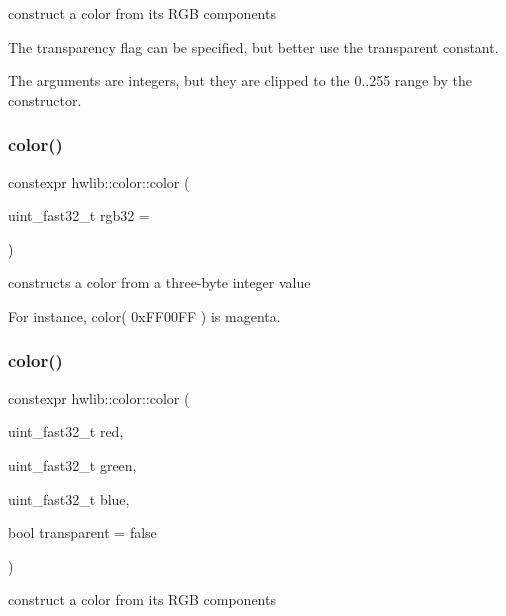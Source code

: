 construct a color from its R\+GB components 

The transparency flag can be specified, but better use the transparent constant.

The arguments are integers, but they are clipped to the 0..255 range by the constructor. \mbox{\label{classhwlib_1_1color_aa8d2263ebf5efe2221171217166a669f}} 
\subsubsection{\texorpdfstring{color()}{color()}\hspace{0.1cm}{\footnotesize\ttfamily [2/4]}}
{\footnotesize\ttfamily constexpr hwlib\+::color\+::color (\begin{DoxyParamCaption}\item[{uint\+\_\+fast32\+\_\+t}]{rgb32 = {} }\end{DoxyParamCaption})\hspace{0.3cm}{\ttfamily [inline]}}



constructs a color from a three-\/byte integer value 

For instance, color( 0x\+F\+F00\+F\+F ) is magenta. \mbox{\label{classhwlib_1_1color_a35fd6b9a03fa8f5b78bbf55052760bd3}} 
\subsubsection{\texorpdfstring{color()}{color()}\hspace{0.1cm}{\footnotesize\ttfamily [3/4]}}
{\footnotesize\ttfamily constexpr hwlib\+::color\+::color (\begin{DoxyParamCaption}\item[{uint\+\_\+fast32\+\_\+t}]{red,  }\item[{uint\+\_\+fast32\+\_\+t}]{green,  }\item[{uint\+\_\+fast32\+\_\+t}]{blue,  }\item[{bool}]{transparent = {\ttfamily false} }\end{DoxyParamCaption})\hspace{0.3cm}{\ttfamily [inline]}}

construct a color from its R\+GB components

